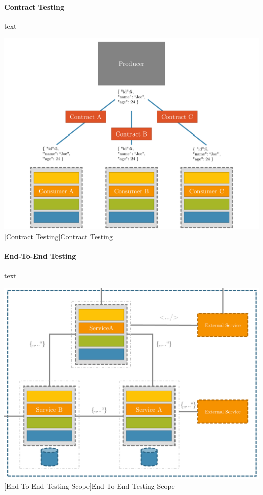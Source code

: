 \documentclass[12pt,a4paper,bibliography=totocnumbered,listof=totocnumbered]{scrartcl}
\begin{document}
\paragraph{Contract Testing}

text

\vspace{1em}
\begin{minipage}{\linewidth}
	\centering
	\includegraphics[width=0.9\linewidth]{images/img_contract-testing.pdf}
	[Contract Testing]{Contract Testing \cite{clemson}}
	\label{fig:img_contract-testing}
\end{minipage}

\paragraph{End-To-End Testing}

text

\vspace{1em}
\begin{minipage}{\linewidth}
	\centering
	\includegraphics[width=0.9\linewidth]{images/img_end-to-end-testing.pdf}
	[End-To-End Testing Scope]{End-To-End Testing Scope \cite{clemson}}
	\label{fig:img_end-to-end-testing}
\end{minipage}
\end{document}
